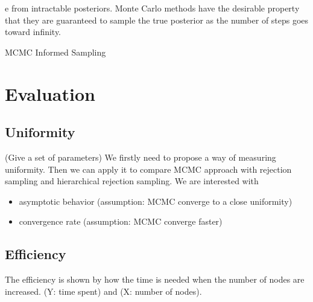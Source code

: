 \documentclass[letterpaper, 10 pt, conference]{ieeeconf}  %
\begin{document}
{e from intractable posteriors. Monte Carlo methods have the desirable property that they are guaranteed to sample the true posterior as the number of steps goes toward infinity.


\begin{algorithm}
	\begin{algorithmic}[1]
		\STATE
   	\end{algorithmic}
	\caption{MCMC Informed Sampling}
	\label{alg:mcmc_informed_sampling}
\end{algorithm}
}

\section{Evaluation}
\label{sec:eval}

\subsection{Uniformity}

(Give a set of parameters)
We firstly need to propose a way of measuring uniformity.
Then we can apply it to compare MCMC approach with rejection sampling and hierarchical rejection sampling.
We are interested with
\begin{itemize}
	\item asymptotic behavior (assumption: MCMC converge to a close uniformity)
	\item convergence rate (assumption: MCMC converge faster)
\end{itemize}

\subsection{Efficiency}

The efficiency is shown by how the time is needed when the number of nodes are increased.
(Y: time spent) and (X: number of nodes).
\end{document}
